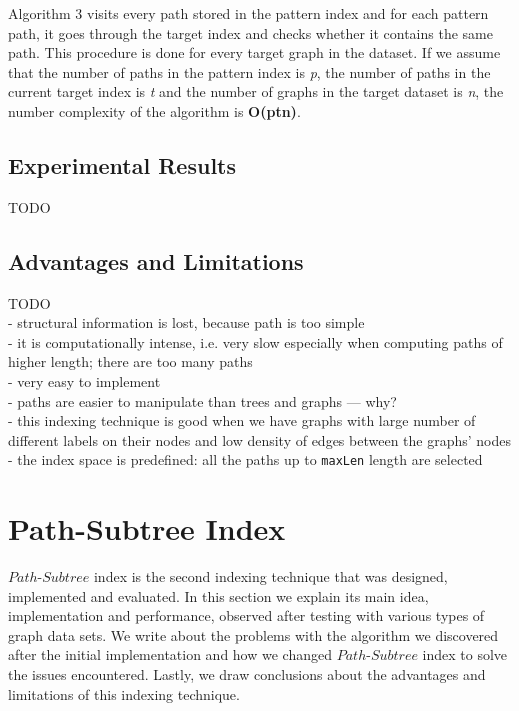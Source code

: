 \documentclass{l4proj}
\begin{document}
Algorithm 3 visits every path stored in the pattern index and for each pattern path, it goes through the target index and checks whether it contains the same path. This procedure is done for every target graph in the dataset. If we assume that the number of paths in the pattern index is \textit{p}, the number of paths in the current target index is \textit{t} and the number of graphs in the target dataset is \textit{n}, the number complexity of the algorithm is \textbf{O(ptn)}.\par
\subsection{Experimental Results}
\label{path-index:experimental-results}
TODO


\subsection{Advantages and Limitations}
\label{path-index:advantages-limitations}
    TODO\\
    - structural information is lost, because path is too simple\\
	- it is computationally intense, i.e. very slow especially when computing paths of higher length; there are too many paths\\
    - very easy to implement\\
    - paths are easier to manipulate than trees and graphs --- why?\\
    - this indexing technique is good when we have graphs with large number of different labels on their nodes and low density of edges between the graphs' nodes\\
    - the index space is predefined: all the paths up to \texttt{maxLen} length are selected\\
\section{Path-Subtree Index}
\label{path-subtree-index}
  $Path$-$Subtree$ index is the second indexing technique that was designed, implemented and evaluated. In this section we explain its main idea, implementation and performance, observed after testing with various types of graph data sets. We write about the problems with the algorithm we discovered after the initial implementation and how we changed $Path$-$Subtree$ index to solve the issues encountered. Lastly, we draw conclusions about the advantages and limitations of this indexing technique.  
\end{document}
